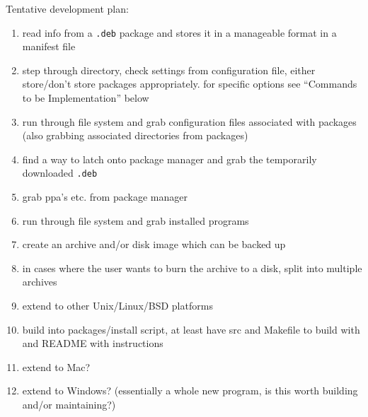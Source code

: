 \documentclass[12pt]{article}
\begin{document}
        Tentative development plan:
        \begin{enumerate}
            \item read info from a \verb+.deb+ package and stores it in a manageable format in a manifest file
            \item step through directory, check settings from configuration file, either store/don't store packages appropriately.  for specific options see ``Commands to be Implementation'' below%
            \item run through file system and grab configuration files associated with packages (also grabbing associated directories from packages)
            \item find a way to latch onto package manager and grab the temporarily downloaded \verb+.deb+
            \item grab ppa's etc. from package manager
            \item run through file system and grab installed programs
            \item create an archive and/or disk image which can be backed up
            \item in cases where the user wants to burn the archive to a disk, split into multiple archives
            \item extend to other Unix/Linux/BSD platforms
            \item build into packages/install script, at least have src and Makefile to build with and README with instructions
            \item extend to Mac?
            \item extend to Windows? (essentially a whole new program, is this worth building and/or maintaining?)
        \end{enumerate}
\end{document}
